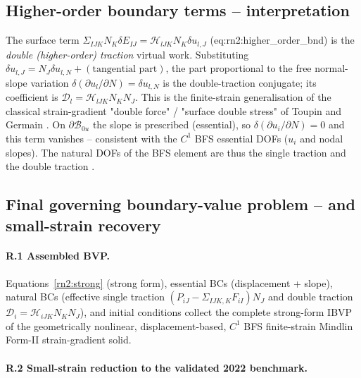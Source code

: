 \documentclass[11pt]{article}
\begin{document}
\subsection{Higher-order boundary terms -- interpretation}
\label{subsec:higherordernotes}

The surface term $\Sigma_{IJK}N_K\delta E_{IJ}=\mathcal{H}_{lJK}N_K\delta u_{l,J}$ (eq:rn2:higher\_order\_bnd) is the \emph{double (higher-order) traction} virtual work. Substituting $\delta u_{l,J}=N_J\delta u_{l,N}+(\text{tangential part})$, the part proportional to the free normal-slope variation $\delta(\partial u_l/\partial N)=\delta u_{l,N}$ is the double-traction conjugate; its coefficient is $\mathcal{D}_l=\mathcal{H}_{lJK}N_KN_J$. This is the finite-strain generalisation of the classical strain-gradient "double force" / "surface double stress" of Toupin and Germain \cite{Toupin1964,Germain1973}. On $\partial\mathcal{B}_{0u}$ the slope is prescribed (essential), so $\delta(\partial u_i/\partial N)=0$ and this term vanishes -- consistent with the $C^1$ BFS essential DOFs ($u_i$ and nodal slopes). The natural DOFs of the BFS element are thus the single traction and the double traction \cite{AmanatidouAravas2002,EngelGarikipati2002}. \checkmark

\subsection{Final governing boundary-value problem -- and small-strain recovery}
\label{subsec:bvpnotes}

\paragraph{R.1 Assembled BVP.} Equations~\eqref{rn2:strong} (strong form), essential BCs (displacement + slope), natural BCs (effective single traction $(P_{iJ}-\Sigma_{IJK,K}F_{iI})N_J$ and double traction $\mathcal{D}_i=\mathcal{H}_{iJK}N_KN_J$), and initial conditions collect the complete strong-form IBVP of the geometrically nonlinear, displacement-based, $C^1$ BFS finite-strain Mindlin Form-II strain-gradient solid.

\paragraph{R.2 Small-strain reduction to the validated 2022 benchmark.}
\end{document}
